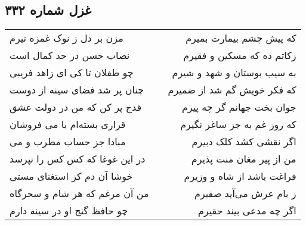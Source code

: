 \begin{center}
\section*{غزل شماره ۳۳۲}
\label{sec:sh332}
\begin{longtable}{l p{0.5cm} r}
مزن بر دل ز نوک غمزه تیرم
&&
که پیش چشم بیمارت بمیرم
\\
نصاب حسن در حد کمال است
&&
زکاتم ده که مسکین و فقیرم
\\
چو طفلان تا کی ای زاهد فریبی
&&
به سیب بوستان و شهد و شیرم
\\
چنان پر شد فضای سینه از دوست
&&
که فکر خویش گم شد از ضمیرم
\\
قدح پر کن که من در دولت عشق
&&
جوان بخت جهانم گر چه پیرم
\\
قراری بسته‌ام با می فروشان
&&
که روز غم به جز ساغر نگیرم
\\
مبادا جز حساب مطرب و می
&&
اگر نقشی کشد کلک دبیرم
\\
در این غوغا که کس کس را نپرسد
&&
من از پیر مغان منت پذیرم
\\
خوشا آن دم کز استغنای مستی
&&
فراغت باشد از شاه و وزیرم
\\
من آن مرغم که هر شام و سحرگاه
&&
ز بام عرش می‌آید صفیرم
\\
چو حافظ گنج او در سینه دارم
&&
اگر چه مدعی بیند حقیرم
\\
\end{longtable}
\end{center}
